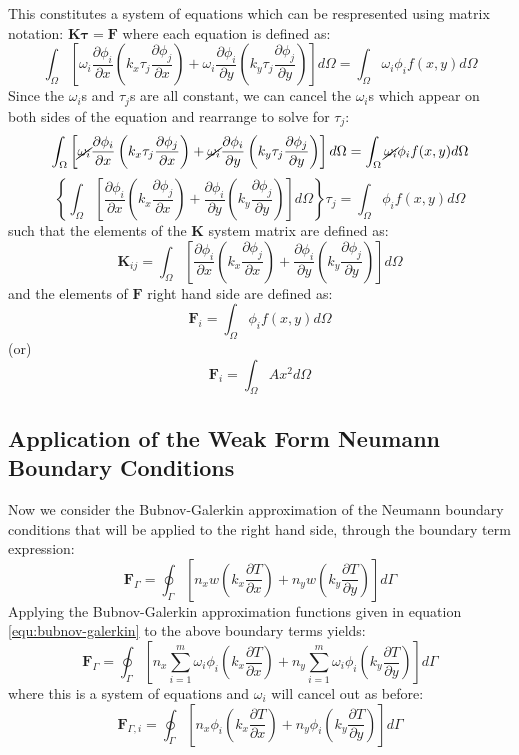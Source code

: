 \documentclass[letterpaper,10pt]{article}
\begin{document}
\noindent This constitutes a system of equations which can be respresented using matrix notation: $\mathbf{K}\mathbf{\tau}=\mathbf{F}$ where each equation is defined as:
\[
\int_\Omega \left[ \omega_i\frac{\partial \phi_i}{\partial x}\left(k_x\tau_j\frac{\partial \phi_j}{\partial x}\right) +  \omega_i\frac{\partial \phi_i}{\partial y}\left(k_y\tau_j\frac{\partial \phi_j}{\partial y}\right) \right]d\Omega = \int_\Omega \omega_i\phi_if(x,y)d\Omega
\]
Since the $\omega_i$s and $\tau_j$s are all constant, we can cancel the $\omega_i$s which appear on both sides of the equation and rearrange to solve for $\tau_j$:
\[
\int_\Omega \left[ \cancel{\omega_i}\frac{\partial \phi_i}{\partial x}\left(k_x\tau_j\frac{\partial \phi_j}{\partial x}\right) +  \cancel{\omega_i}\frac{\partial \phi_i}{\partial y}\left(k_y\tau_j\frac{\partial \phi_j}{\partial y}\right) \right]d\Omega = \int_\Omega \cancel{\omega_i}\phi_if(x,y)d\Omega
\]
\[
\left\{\int_\Omega \left[ \frac{\partial \phi_i}{\partial x}\left(k_x\frac{\partial \phi_j}{\partial x}\right) + \frac{\partial \phi_i}{\partial y}\left(k_y\frac{\partial \phi_j}{\partial y}\right) \right]d\Omega\right\}\tau_j = \int_\Omega \phi_if(x,y)d\Omega
\]
\noindent such that the elements of the $\mathbf{K}$ system matrix are defined as:
\begin{equation}
\label{equ:Kij}
\boxed{\mathbf{K}_{ij} = \int_\Omega \left[ \frac{\partial \phi_i}{\partial x}\left(k_x\frac{\partial \phi_j}{\partial x}\right) + \frac{\partial \phi_i}{\partial y}\left(k_y\frac{\partial \phi_j}{\partial y}\right) \right]d\Omega}
\end{equation}
\noindent and the elements of $\mathbf{F}$ right hand side are defined as:
\begin{equation}
\label{equ:Fi}
\boxed{\mathbf{F}_i = \int_\Omega \phi_if(x,y)d\Omega}
\end{equation}
(or)
\[\mathbf{F}_i = \int_\Omega Ax^2d\Omega\]

\subsection{Application of the Weak Form Neumann Boundary Conditions}
Now we consider the Bubnov-Galerkin approximation of the Neumann boundary conditions that will be applied to the right hand side, through the boundary term expression:
\[
\mathbf{F}_\Gamma = \oint_\Gamma \left[n_xw\left(k_x\frac{\partial T}{\partial x}\right) + n_yw\left(k_y\frac{\partial T}{\partial y}\right)\right]d\Gamma
\]
\noindent Applying the Bubnov-Galerkin approximation functions given in equation \ref{equ:bubnov-galerkin} to the above boundary terms yields:
\[
\mathbf{F}_\Gamma = \oint_\Gamma \left[n_x\displaystyle\sum\limits_{i=1}^m\omega_i\phi_i\left(k_x\frac{\partial T}{\partial x}\right) + n_y\displaystyle\sum\limits_{i=1}^m\omega_i\phi_i\left(k_y\frac{\partial T}{\partial y}\right)\right]d\Gamma
\]
\noindent where this is a system of equations and $\omega_i$ will cancel out as before:
\[
\mathbf{F}_{\Gamma,i} = \oint_\Gamma \left[n_x\phi_i\left(k_x\frac{\partial T}{\partial x}\right) + n_y\phi_i\left(k_y\frac{\partial T}{\partial y}\right)\right]d\Gamma
\]
\end{document}
